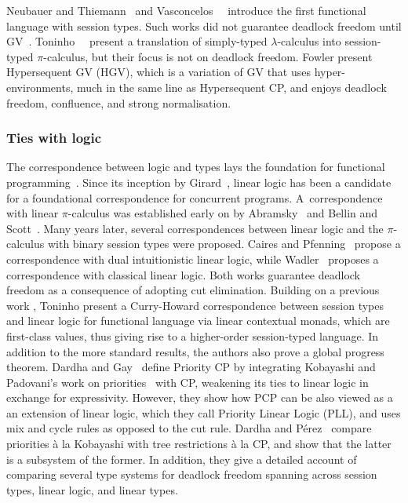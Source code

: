 Neubauer and Thiemann~\cite{neubauert04} and Vasconcelos~\etal~\cite{vasconcelosravara04,vasconcelosgay06} introduce the first functional language with session types. Such works did not guarantee deadlock freedom until GV~\cite{lindleymorris15,wadler14}.
Toninho~\etal~\cite{toninhocaires12} present a translation of simply-typed $\lambda$-calculus into session-typed $\pi$-calculus, but their focus is not on deadlock freedom.
Fowler \etal \cite{fowleretal21} present Hypersequent GV (HGV), which is a variation of GV that uses hyper-environments, much in the same line as Hypersequent CP, and enjoys deadlock freedom, confluence, and strong normalisation.

\subsubsection*{Ties with logic}
The correspondence between logic and types lays the foundation for functional programming~\cite{wadler15}.
Since its inception by Girard~\cite{girard87}, linear logic has been a candidate for a foundational correspondence for concurrent programs.
A~correspondence with linear $\pi$-calculus was established early on by Abramsky~\cite{abramsky94} and Bellin and Scott~\cite{bellinscott94}. Many years later, several correspondences between linear logic and the $\pi$-calculus with binary session types were proposed. Caires and Pfenning~\cite{cairespfenning10} propose a correspondence with dual intuitionistic linear logic, while Wadler~\cite{wadler12} proposes a correspondence with classical linear logic. Both works guarantee deadlock freedom as a consequence of adopting cut elimination.
Building on a previous work \cite{cairespfenning10}, Toninho \etal \cite{toninhoetal13} present a Curry-Howard correspondence between session types and linear logic for functional language via linear contextual monads, which are first-class values, thus giving rise to a higher-order session-typed  language. In addition to the more standard results, the authors also prove a global progress theorem.
Dardha and Gay~\cite{dardhagay18extended} define Priority CP by integrating Kobayashi and Padovani's work on priorities~\cite{kobayashi06,padovani14} with CP, weakening its ties to linear logic in exchange for expressivity. However, they show how PCP can be also {viewed as} a an extension of linear logic, which they call Priority Linear Logic (PLL), and uses mix and cycle rules as opposed to the cut rule.
Dardha and P\'{e}rez~\cite{dardhaperez15extended,dardhaperez15,DardhaP22} compare priorities \`a la Kobayashi with tree restrictions \`a la CP, and show that the latter is a subsystem of the former. In addition, they give a detailed account of comparing several type systems for deadlock freedom spanning across session types, linear logic, and linear types.
